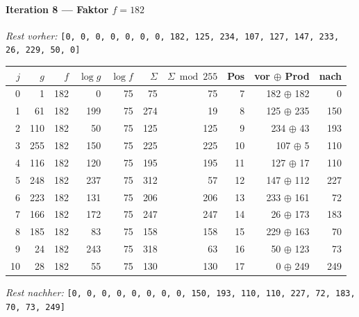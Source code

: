 \paragraph{Iteration 8 — Faktor $f = 182$}
\textit{Rest vorher:} \texttt{[0, 0, 0, 0, 0, 0, 0, 182, 125, 234, 107, 127, 147, 233, 26, 229, 50, 0]}\par
\begin{center}
\footnotesize
\setlength{\tabcolsep}{4pt}
\renewcommand{\arraystretch}{1.1}
\begin{tabular}{r|rr|rrrr|rrr}
\toprule
$j$ & $g$ & $f$ & $\log g$ & $\log f$ & $\Sigma$ & $\Sigma\bmod 255$ & Pos & vor $\oplus$ Prod & nach \\
\midrule
0 & 1 & 182 & 0 & 75 & 75 & 75 & 7 & 182 $\oplus$ 182 & 0 \\
1 & 61 & 182 & 199 & 75 & 274 & 19 & 8 & 125 $\oplus$ 235 & 150 \\
2 & 110 & 182 & 50 & 75 & 125 & 125 & 9 & 234 $\oplus$ 43 & 193 \\
3 & 255 & 182 & 150 & 75 & 225 & 225 & 10 & 107 $\oplus$ 5 & 110 \\
4 & 116 & 182 & 120 & 75 & 195 & 195 & 11 & 127 $\oplus$ 17 & 110 \\
5 & 248 & 182 & 237 & 75 & 312 & 57 & 12 & 147 $\oplus$ 112 & 227 \\
6 & 223 & 182 & 131 & 75 & 206 & 206 & 13 & 233 $\oplus$ 161 & 72 \\
7 & 166 & 182 & 172 & 75 & 247 & 247 & 14 & 26 $\oplus$ 173 & 183 \\
8 & 185 & 182 & 83 & 75 & 158 & 158 & 15 & 229 $\oplus$ 163 & 70 \\
9 & 24 & 182 & 243 & 75 & 318 & 63 & 16 & 50 $\oplus$ 123 & 73 \\
10 & 28 & 182 & 55 & 75 & 130 & 130 & 17 & 0 $\oplus$ 249 & 249 \\
\bottomrule
\end{tabular}
\end{center}
\textit{Rest nachher:} \texttt{[0, 0, 0, 0, 0, 0, 0, 0, 150, 193, 110, 110, 227, 72, 183, 70, 73, 249]}\par\medskip
